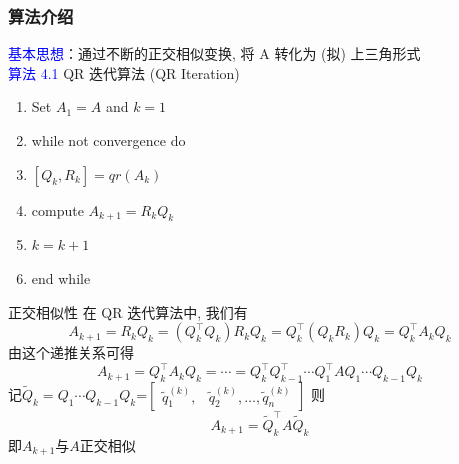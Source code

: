 \documentclass[12pt,a4paper]{article}
\begin{document}
	\subsubsection{算法介绍}
	\noindent \textcolor{blue}{基本思想}：通过不断的正交相似变换, 将 A 转化为 (拟) 上三角形式\\
	\textcolor{blue}{算法 4.1} QR 迭代算法 (QR Iteration)\\
	\begin{enumerate}[1:]
		\item Set $A_{1}=A$ and $k=1$
		\item while not convergence do
		\item \qquad $[Q_{k},R_{k}]=qr(A_{k})$
		\item \qquad compute $A_{k+1}=R_{k}Q_{k}$
		\item \qquad$k=k+1$
		\item end while
	\end{enumerate}
	正交相似性
	在 QR 迭代算法中, 我们有
	$$
	A_{k+1}=R_{k} Q_{k}=\left(Q_{k}^{\top} Q_{k}\right) R_{k} Q_{k}=Q_{k}^{\top}\left(Q_{k} R_{k}\right) Q_{k}=Q_{k}^{\top} A_{k} Q_{k}
	$$
	由这个递推关系可得
	$$
	A_{k+1}=Q_{k}^{\top} A_{k} Q_{k}=\cdots=Q_{k}^{\top} Q_{k-1}^{\top} \cdots Q_{1}^{\top} A Q_{1} \cdots Q_{k-1} Q_{k}
	$$
	记$\tilde{Q}_{k}=Q_{1} \cdots Q_{k-1} Q_{k}$=$\left[\begin{array}{ll}{\tilde{q}_{1}^{(k)},} & {\tilde{q}_{2}^{(k)}, \ldots, \tilde{q}_{n}^{(k)}}\end{array}\right]$
	则
	\begin{equation} 
	A_{k+1}=\tilde{Q}_{k}^{\top} A \tilde{Q}_{k}
	\end{equation}
	即$A_{k+1}$与$A$正交相似
\end{document}
